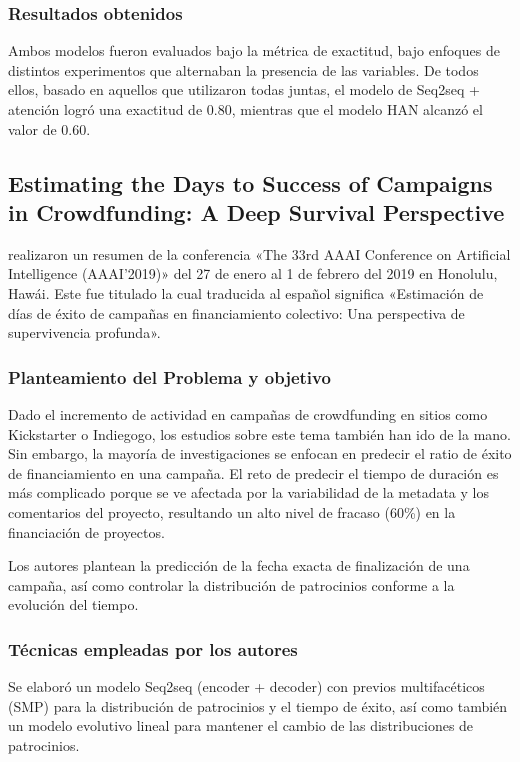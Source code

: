 \subsubsection{Resultados obtenidos}
Ambos modelos fueron evaluados bajo la métrica de exactitud, bajo enfoques de distintos experimentos que alternaban la presencia de las variables. De todos ellos, basado en aquellos que utilizaron todas juntas, el modelo de Seq2seq + atención logró una exactitud de 0.80, mientras que el modelo HAN alcanzó el valor de 0.60.

\subsection{Estimating the Days to Success of Campaigns in Crowdfunding: A Deep Survival Perspective \citep*{pr_jin2019dayssuccess}}
\citeauthor{pr_jin2019dayssuccess} realizaron un resumen de la conferencia «The 33rd AAAI Conference on Artificial Intelligence (AAAI'2019)» del 27 de enero al 1 de febrero del 2019 en Honolulu, Hawái. Este fue titulado  la cual traducida al español significa «Estimación de días de éxito de campañas en financiamiento colectivo: Una perspectiva de supervivencia profunda».

\subsubsection{Planteamiento del Problema y objetivo}
Dado el incremento de actividad en campañas de crowdfunding en sitios como Kickstarter o Indiegogo, los estudios sobre este tema también han ido de la mano. Sin embargo, la mayoría de investigaciones se enfocan en predecir el ratio de éxito de financiamiento en una campaña. El reto de predecir el tiempo de duración es más complicado porque se ve afectada por la variabilidad de la metadata y los comentarios del proyecto, resultando un alto nivel de fracaso (60\%) en la financiación de proyectos.

Los autores plantean la predicción de la fecha exacta de finalización de una campaña, así como controlar la distribución de patrocinios conforme a la evolución del tiempo.

\subsubsection{Técnicas empleadas por los autores}
Se elaboró un modelo Seq2seq (encoder + decoder) con previos multifacéticos (SMP) para la distribución de patrocinios y el tiempo de éxito, así como también un modelo evolutivo lineal para mantener el cambio de las distribuciones de patrocinios.

